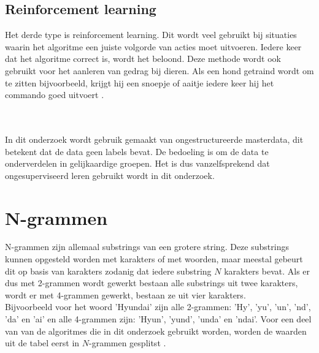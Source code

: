 \subsection{Reinforcement learning}
Het derde type is reinforcement learning. Dit wordt veel gebruikt bij situaties waarin het algoritme een juiste volgorde van acties moet uitvoeren. Iedere keer dat het algoritme correct is, wordt het beloond. Deze methode wordt ook gebruikt voor het aanleren van gedrag bij dieren. Als een hond getraind wordt om te zitten bijvoorbeeld, krijgt hij een snoepje of aaitje iedere keer hij het commando goed uitvoert \autocite{Postma2019}.

\\\indent
\\\indent
In dit onderzoek wordt gebruik gemaakt van ongestructureerde masterdata, dit betekent dat de data geen labels bevat. De bedoeling is om de data te onderverdelen in gelijkaardige groepen. Het is dus vanzelfsprekend dat ongesuperviseerd leren gebruikt wordt in dit onderzoek.

\section{N-grammen}
N-grammen zijn allemaal substrings van een grotere string. Deze substrings kunnen opgesteld worden met karakters of met woorden, maar meestal gebeurt dit op basis van karakters zodanig dat iedere substring $N$ karakters bevat. Als er dus met 2-grammen wordt gewerkt bestaan alle substrings uit twee karakters, wordt er met 4-grammen gewerkt, bestaan ze uit vier karakters.
\\\indent
Bijvoorbeeld voor het woord 'Hyundai' zijn alle 2-grammen: 'Hy', 'yu', 'un', 'nd', 'da' en 'ai' en alle 4-grammen zijn: 'Hyun', 'yund', 'unda' en 'ndai'. Voor een deel van van de algoritmes die in dit onderzoek gebruikt worden, worden de waarden uit de tabel eerst in $N$-grammen gesplitst \autocite{Santos2009}.

